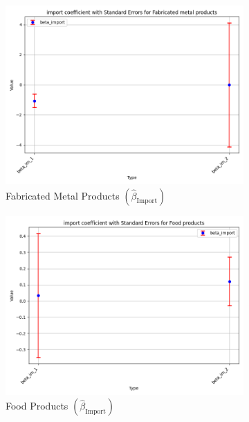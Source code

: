 \documentclass{article}
\begin{document}
\begin{figure}[ht!]
    \begin{subfigure}[t]{0.32\textwidth}
        \centering
        \includegraphics[width=\textwidth]{figure/empirical_ar1_normal_kmshare_ciiu_beta_import_with_error_bars_Fabricated metal products.png}
        \caption{Fabricated Metal Products $(\hat{\beta}_{\text{Import}})$}
    \end{subfigure}
    \begin{subfigure}[t]{0.32\textwidth}
        \centering
        \includegraphics[width=\textwidth]{figure/empirical_ar1_normal_kmshare_ciiu_beta_import_with_error_bars_Food products.png}
        \caption{Food Products $(\hat{\beta}_{\text{Import}})$}
    \end{subfigure}
    \begin{subfigure}[t]{0.32\textwidth}

\end{subfigure}
\end{figure}
\end{document}
